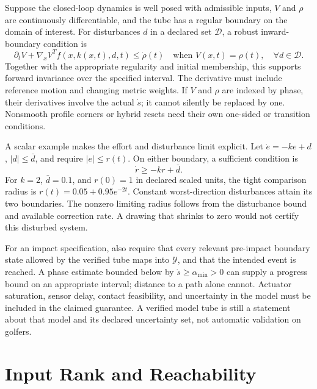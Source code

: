 Suppose the closed-loop dynamics is well posed with admissible inputs,
$V$ and $\rho$ are continuously differentiable, and the tube has a regular
boundary on the domain of interest. For disturbances $d$ in a declared set
$\mathcal D$, a robust inward-boundary condition is
\begin{equation}
 \partial_t V+\nabla_x V^Tf(x,k(x,t),d,t)\leq\dot\rho(t)
 \quad\text{when }V(x,t)=\rho(t),\quad\forall d\in\mathcal D.
 \label{eq:motion_tube_boundary}
\end{equation}
Together with the appropriate regularity and initial membership, this supports
forward invariance over the specified interval. The derivative must include
reference motion and changing metric weights. If $V$ and $\rho$ are indexed
by phase, their derivatives involve the actual $\dot s$; it cannot silently
be replaced by one. Nonsmooth profile corners or hybrid resets need their own
one-sided or transition conditions.

A scalar example makes the effort and disturbance limit explicit. Let
$\dot e=-ke+d$, $|d|\leq\bar d$, and require $|e|\leq r(t)$. On either boundary,
a sufficient condition is
\begin{equation}
 \dot r\geq-kr+\bar d.
 \label{eq:motion_radius_condition}
\end{equation}
For $k=2$, $\bar d=0.1$, and $r(0)=1$ in declared scaled units, the tight
comparison radius is $r(t)=0.05+0.95e^{-2t}$. Constant worst-direction
disturbances attain its two boundaries. The nonzero limiting radius follows
from the disturbance bound and available correction rate. A drawing that
shrinks to zero would not certify this disturbed system.

For an impact specification, also require that every relevant pre-impact
boundary state allowed by the verified tube maps into $\mathcal Y$, and that
the intended event is reached. A phase estimate bounded below by
$\dot s\geq\alpha_{\min}>0$ can supply a progress bound on an appropriate
interval; distance to a path alone cannot. Actuator saturation, sensor delay,
contact feasibility, and uncertainty in the model must be included in the
claimed guarantee. A verified model tube is still a statement about that model
and its declared uncertainty set, not automatic validation on golfers.

\section{Input Rank and Reachability}

